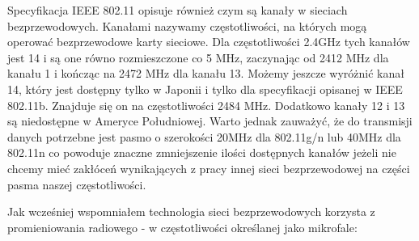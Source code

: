 Specyfikacja IEEE 802.11 opisuje również czym są kanały w sieciach bezprzewodowych. Kanałami nazywamy częstotliwości, na których mogą operować bezprzewodowe karty sieciowe. Dla częstotliwości 2.4GHz tych kanałów jest 14 i są one równo rozmieszczone co 5 MHz, zaczynając od 2412 MHz dla kanału 1 i kończąc na 2472 MHz dla kanału 13. Możemy jeszcze wyróżnić kanał 14, który jest dostępny tylko w Japonii i tylko dla specyfikacji opisanej w IEEE 802.11b. Znajduje się on na częstotliwości 2484 MHz. Dodatkowo kanały 12 i 13 są niedostępne w Ameryce Południowej. Warto jednak zauważyć, że do transmisji danych potrzebne jest pasmo o szerokości 20MHz dla 802.11g/n lub 40MHz dla 802.11n co powoduje znaczne zmniejszenie ilości dostępnych kanałów jeżeli nie chcemy mieć zakłóceń wynikających z pracy innej sieci bezprzewodowej na części pasma naszej częstotliwości.\cite{WifiChannelsWiki}

Jak wcześniej wspomniałem technologia sieci bezprzewodowych korzysta z promieniowania radiowego - w częstotliwości określanej jako mikrofale:\cite{FaleRadioweWiki}

